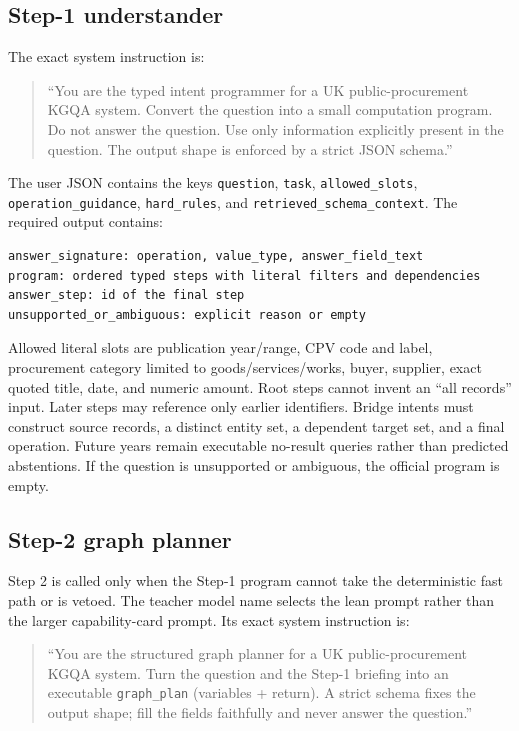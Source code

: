 \subsection{Step-1 understander}

The exact system instruction is:

\begin{quote}\small
``You are the typed intent programmer for a UK public-procurement KGQA system. Convert the question
into a small computation program. Do not answer the question. Use only information explicitly
present in the question. The output shape is enforced by a strict JSON schema.''
\end{quote}

The user JSON contains the keys \texttt{question}, \texttt{task}, \texttt{allowed\_slots},
\texttt{operation\_guidance}, \texttt{hard\_rules}, and
\texttt{retrieved\_schema\_context}.  The required output contains:

\begin{verbatim}
answer_signature: operation, value_type, answer_field_text
program: ordered typed steps with literal filters and dependencies
answer_step: id of the final step
unsupported_or_ambiguous: explicit reason or empty
\end{verbatim}

Allowed literal slots are publication year/range, CPV code and label, procurement category limited
to goods/services/works, buyer, supplier, exact quoted title, date, and numeric amount.  Root steps
cannot invent an ``all records'' input.  Later steps may reference only earlier identifiers.
Bridge intents must construct source records, a distinct entity set, a dependent target set, and a
final operation.  Future years remain executable no-result queries rather than predicted
abstentions.  If the question is unsupported or ambiguous, the official program is empty.

\subsection{Step-2 graph planner}

Step 2 is called only when the Step-1 program cannot take the deterministic fast path or is vetoed.
The teacher model name selects the lean prompt rather than the larger capability-card prompt.  Its
exact system instruction is:

\begin{quote}\small
``You are the structured graph planner for a UK public-procurement KGQA system. Turn the question
and the Step-1 briefing into an executable \texttt{graph\_plan} (variables + return). A strict
schema fixes the output shape; fill the fields faithfully and never answer the question.''
\end{quote}

